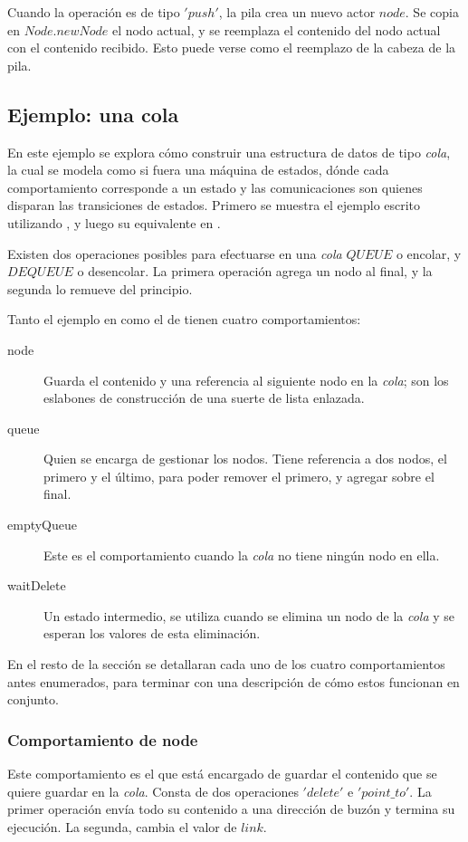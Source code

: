 Cuando la operación es de tipo $'push'$, la pila crea un nuevo actor $node$. Se copia en $Node.newNode$ el nodo actual, y se reemplaza el contenido del nodo actual con el contenido recibido. Esto puede verse como el reemplazo de la cabeza de la pila.

\subsection{Ejemplo: una cola}\label{ejemplo:cola}

En este ejemplo se explora cómo construir una estructura de datos de tipo \textit{cola}, la cual se modela como si fuera una máquina de estados, dónde cada comportamiento corresponde a un estado y las comunicaciones son quienes disparan las transiciones de estados. Primero se muestra el ejemplo escrito utilizando \SAL, y luego su equivalente en \CSP.

Existen dos operaciones posibles para efectuarse en una \textit{cola} $QUEUE$ o encolar, y $DEQUEUE$ o desencolar. La primera operación agrega un nodo al final, y la segunda lo remueve del principio. 

Tanto el ejemplo en \SAL como el de \CSP tienen cuatro comportamientos:

\begin{description}
 \item [node] Guarda el contenido y una referencia al siguiente nodo en la \textit{cola}; son los eslabones de construcción de una suerte de lista enlazada.
 \item [queue] Quien se encarga de gestionar los nodos. Tiene referencia a dos nodos, el primero y el último, para poder remover el primero, y agregar sobre el final.
 \item [emptyQueue] Este es el comportamiento cuando la \textit{cola} no tiene ningún nodo en ella.
 \item [waitDelete] Un estado intermedio, se utiliza cuando se elimina un nodo de la \textit{cola} y se esperan los valores de esta eliminación.
\end{description}

En el resto de la sección se detallaran cada uno de los cuatro comportamientos antes enumerados, para terminar con una descripción de cómo estos funcionan en conjunto.

\subsubsection*{Comportamiento de node}
Este comportamiento es el que está encargado de guardar el contenido que se quiere guardar en la \textit{cola}. Consta de dos operaciones $'delete'$ e $'point\_to'$. La primer operación envía todo su contenido a una dirección de buzón y termina su ejecución. La segunda, cambia el valor de $link$.

